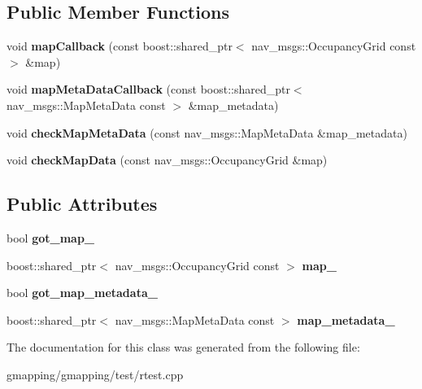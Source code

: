 \subsection*{Public Member Functions}
\begin{DoxyCompactItemize}
\item 
\mbox{\label{classMapClientTest_a3a463362d3738d287a265c783a0d3352}} 
void {\bfseries map\+Callback} (const boost\+::shared\+\_\+ptr$<$ nav\+\_\+msgs\+::\+Occupancy\+Grid const $>$ \&map)
\item 
\mbox{\label{classMapClientTest_a66191cde7942520b905dfa4fd1ee4287}} 
void {\bfseries map\+Meta\+Data\+Callback} (const boost\+::shared\+\_\+ptr$<$ nav\+\_\+msgs\+::\+Map\+Meta\+Data const $>$ \&map\+\_\+metadata)
\item 
\mbox{\label{classMapClientTest_aac9d9a29e7208042e435382c18478d85}} 
void {\bfseries check\+Map\+Meta\+Data} (const nav\+\_\+msgs\+::\+Map\+Meta\+Data \&map\+\_\+metadata)
\item 
\mbox{\label{classMapClientTest_a27b3cbe0e26242fd871b51d211b7c645}} 
void {\bfseries check\+Map\+Data} (const nav\+\_\+msgs\+::\+Occupancy\+Grid \&map)
\end{DoxyCompactItemize}
\subsection*{Public Attributes}
\begin{DoxyCompactItemize}
\item 
\mbox{\label{classMapClientTest_a37b538b72b0f8e24235c9ea313323ce2}} 
bool {\bfseries got\+\_\+map\+\_\+}
\item 
\mbox{\label{classMapClientTest_a1d2091f47ae14508d485c72fb6ce1f79}} 
boost\+::shared\+\_\+ptr$<$ nav\+\_\+msgs\+::\+Occupancy\+Grid const  $>$ {\bfseries map\+\_\+}
\item 
\mbox{\label{classMapClientTest_a45eb6fef44baf941ef21dceef15b011e}} 
bool {\bfseries got\+\_\+map\+\_\+metadata\+\_\+}
\item 
\mbox{\label{classMapClientTest_ada6b59e9d7e2d8f36d89392265b7e5ef}} 
boost\+::shared\+\_\+ptr$<$ nav\+\_\+msgs\+::\+Map\+Meta\+Data const  $>$ {\bfseries map\+\_\+metadata\+\_\+}
\end{DoxyCompactItemize}


The documentation for this class was generated from the following file\+:\begin{DoxyCompactItemize}
\item 
gmapping/gmapping/test/rtest.\+cpp\end{DoxyCompactItemize}
